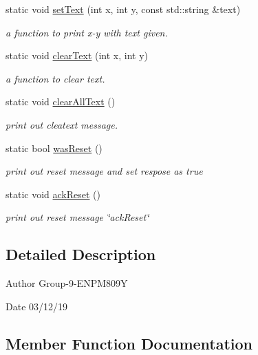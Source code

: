\begin{DoxyCompactItemize}
static void \hyperlink{classfp_1_1_a_p_i_a4635f5c0c48d2ab53f4436be402c5566}{set\+Text} (int x, int y, const std\+::string \&text)
\begin{DoxyCompactList}\small\item\em a function to print x-\/y with text given. \end{DoxyCompactList}\item 
static void \hyperlink{classfp_1_1_a_p_i_a0b23c3b22476d1826987b93b518010d1}{clear\+Text} (int x, int y)
\begin{DoxyCompactList}\small\item\em a function to clear text. \end{DoxyCompactList}\item 
static void \hyperlink{classfp_1_1_a_p_i_ae0b4d27428aad11e98647b88947f2c34}{clear\+All\+Text} ()
\begin{DoxyCompactList}\small\item\em print out cleatext message. \end{DoxyCompactList}\item 
static bool \hyperlink{classfp_1_1_a_p_i_a390976eee05262068b7387f1421d906a}{was\+Reset} ()
\begin{DoxyCompactList}\small\item\em print out reset message and set respose as true \end{DoxyCompactList}\item 
static void \hyperlink{classfp_1_1_a_p_i_a0c30419c7237b12bc916ce17f93a5be4}{ack\+Reset} ()
\begin{DoxyCompactList}\small\item\em print out reset message \char`\"{}ack\+Reset\char`\"{} \end{DoxyCompactList}\end{DoxyCompactItemize}


\subsection{Detailed Description}
\begin{DoxyAuthor}{Author}
Group-\/9-\/\+E\+N\+P\+M809Y 
\end{DoxyAuthor}
\begin{DoxyDate}{Date}
03/12/19 
\end{DoxyDate}


\subsection{Member Function Documentation}
\mbox{\label{classfp_1_1_a_p_i_a0c30419c7237b12bc916ce17f93a5be4}} 
